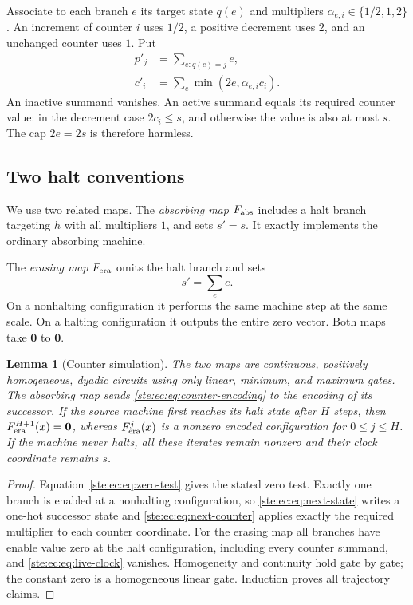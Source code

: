 \documentclass[11pt,letterpaper]{article}
\newtheorem{lemma}[theorem]{Lemma}
\theoremstyle{definition}
\theoremstyle{remark}
\newcommand{\zero}{\mathbf 0}
\begin{document}
Associate to each branch $e$ its target state $q(e)$ and multipliers
$\alpha_{e,i}\in\{1/2,1,2\}$. An increment of counter $i$ uses $1/2$, a
positive decrement uses $2$, and an unchanged counter uses $1$. Put
\begin{align}
 p'_j&=\sum_{e:q(e)=j}e,
 \label{ste:ec:eq:next-state}\\
 c'_i&=\sum_e\min(2e,\alpha_{e,i}c_i).
 \label{ste:ec:eq:next-counter}
\end{align}
An inactive summand vanishes. An active summand equals its required
counter value: in the decrement case $2c_i\leq s$, and otherwise the value
is also at most $s$. The cap $2e=2s$ is therefore harmless.

\subsection{Two halt conventions}

We use two related maps. The \emph{absorbing map} $F_{\rm abs}$ includes a
halt branch targeting $h$ with all multipliers $1$, and sets $s'=s$.
It exactly implements the ordinary absorbing machine.

The \emph{erasing map} $F_{\rm era}$ omits the halt branch and sets
\begin{equation}
 s'=\sum_e e.
 \label{ste:ec:eq:live-clock}
\end{equation}
On a nonhalting configuration it performs the same machine step at the
same scale. On a halting configuration it outputs the entire zero vector.
Both maps take $\zero$ to $\zero$.

\begin{lemma}[Counter simulation]
\label{ste:ec:lem:counter}
The two maps are continuous, positively homogeneous, dyadic circuits using
only linear, minimum, and maximum gates. The absorbing map sends
\eqref{ste:ec:eq:counter-encoding} to the encoding of its successor. If the source
machine first reaches its halt state after $H$ steps, then
$F_{\rm era}^{H+1}(x)=\zero$, whereas $F_{\rm era}^j(x)$ is a nonzero
encoded configuration for $0\leq j\leq H$. If the machine never halts,
all these iterates remain nonzero and their clock coordinate remains $s$.
\end{lemma}

\begin{proof}
Equation~\eqref{ste:ec:eq:zero-test} gives the stated zero test. Exactly one
branch is enabled at a nonhalting configuration, so
\eqref{ste:ec:eq:next-state} writes a one-hot successor state and
\eqref{ste:ec:eq:next-counter} applies exactly the required multiplier to each
counter coordinate. For the erasing map all branches have enable value
zero at the halt configuration, including every counter summand, and
\eqref{ste:ec:eq:live-clock} vanishes. Homogeneity and continuity hold gate by
gate; the constant zero is a homogeneous linear gate. Induction proves
all trajectory claims.
\end{proof}
\end{document}
